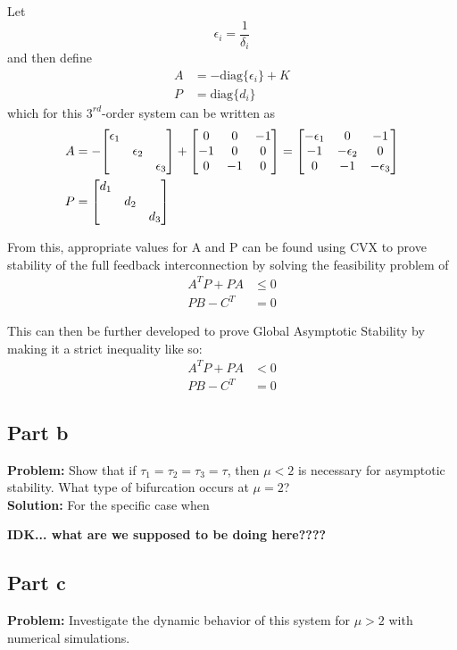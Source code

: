 \documentclass[letter]{article}
\begin{document}
Let $$\epsilon_i = \frac{1}{\delta_i}$$ and then define
\begin{align}
	A &= - \text{diag}\{\epsilon_i\} + K\\
	P &= \text{diag}\{d_i\}
\end{align}
which for this $3^{rd}$-order system can be written as
\begin{align}
	A &= -\mqty[\dmat{\epsilon_1}{\epsilon_2}{\epsilon_3}] + \mqty[0 & 0 &-1\\ -1 & 0 & 0\\ 0 &-1 & 0] 
	= \mqty[-\epsilon_1 & 0 &-1\\
			 -1 &-\epsilon_2 &0\\
			 0	&-1	&-\epsilon_3]\\
	P &= \mqty[\dmat{d_1}{d_2}{d_3}]
\end{align}

From this, appropriate values for A and P can be found using CVX to prove stability of the full feedback interconnection by solving the feasibility problem of
\begin{align}
	A^T P + P A &\leq 0\\
	PB - C^T &= 0
\end{align}

This can then be further developed to prove Global Asymptotic Stability by making it a strict inequality like so:
\begin{align}
	A^T P + P A &< 0\\
	PB - C^T &= 0
\end{align}

\newpage
\subsection{Part b}
\textbf{Problem:}
Show that if $\tau_1 = \tau_2 = \tau_3 = \tau$, then $\mu <2$ is necessary for asymptotic stability. What type of bifurcation occurs at $\mu = 2$?\\

\noindent
\textbf{Solution:}
For the specific case when 


\textbf{IDK... what are we supposed to be doing here????}









\newpage
\subsection{Part c}
\textbf{Problem:}
Investigate the dynamic behavior of this system for $\mu > 2$ with numerical simulations.
\end{document}
